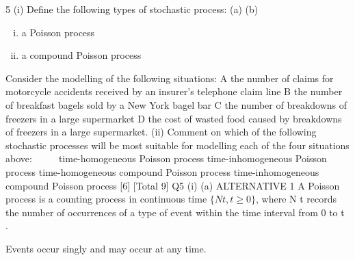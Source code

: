 \documentclass[a4paper,12pt]{article}
\begin{document}
5
(i)
Define the following types of stochastic process:
(a)
(b)
\begin{enumerate}[(i)]
\item a Poisson process
\item a compound Poisson process
\end{enumerate}

Consider the modelling of the following situations:
A the number of claims for motorcycle accidents received by an insurer’s
telephone claim line
B the number of breakfast bagels sold by a New York bagel bar
C the number of breakdowns of freezers in a large supermarket
D the cost of wasted food caused by breakdowns of freezers in a large
supermarket.
(ii) Comment on which of the following stochastic processes will be most suitable
for modelling each of the four situations above:




time-homogeneous Poisson process
time-inhomogeneous Poisson process
time-homogeneous compound Poisson process
time-inhomogeneous compound Poisson process
[6]
[Total 9]
\newpage
Q5
(i)
(a)
ALTERNATIVE 1
A Poisson process is a counting process in continuous time $\{ N t , t \geq 0\}$,
where N t records the number of occurrences of a type of event within
the time interval from 0 to t .

Events occur singly and may occur at any time.
\end{document}
